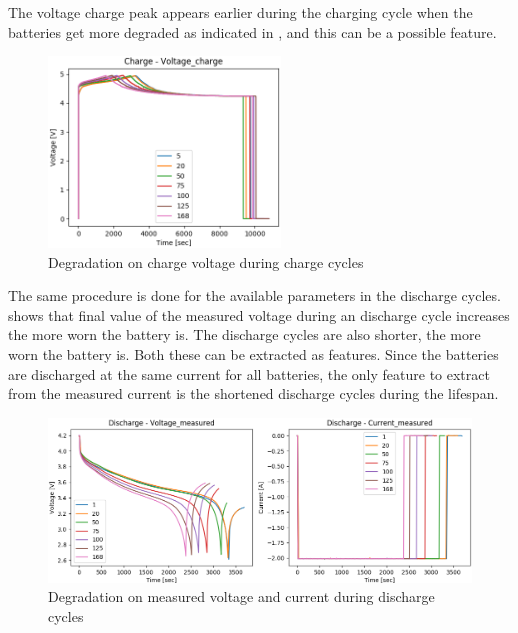 \documentclass[english, a4paper]{report}
\begin{document}
{{{{                The voltage charge peak appears earlier during the charging cycle when the batteries get more degraded as indicated in , and this can be a possible feature.
                
                \begin{figure}[H]
                    \centering \includegraphics[width=0.55\textwidth]{ChargeDegradation3}
                    \caption{Degradation on charge voltage during charge cycles}
                    \label{fig:ChargeDegradation3}
                \end{figure}
                
                The same procedure is done for the available parameters in the discharge cycles.  shows that final value of the measured voltage during an discharge cycle increases the more worn the battery is. The discharge cycles are also shorter, the more worn the battery is. Both these can be extracted as features. Since the batteries are discharged at the same current for all batteries, the only feature to extract from the measured current is the shortened discharge cycles during the lifespan.
                
                \begin{figure}[H]
                    \centering \includegraphics[width=1\textwidth]{DischargeDegradation1}
                    \caption{Degradation on measured voltage and current during discharge cycles}
                    \label{fig:DischargeDegradation1}
                \end{figure}
                
}}}}
\end{document}
